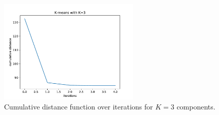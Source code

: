 \documentclass{article}
\begin{document}
\begin{figure}[!ht]
\centering
\includegraphics[width=0.6\textwidth]{./Figures/2_2_Kmeans_distance_K3}
\caption{Cumulative distance function over iterations for $K=3$ components.}
\label{2_2_Kmeans_distance}
\end{figure}
\end{document}
